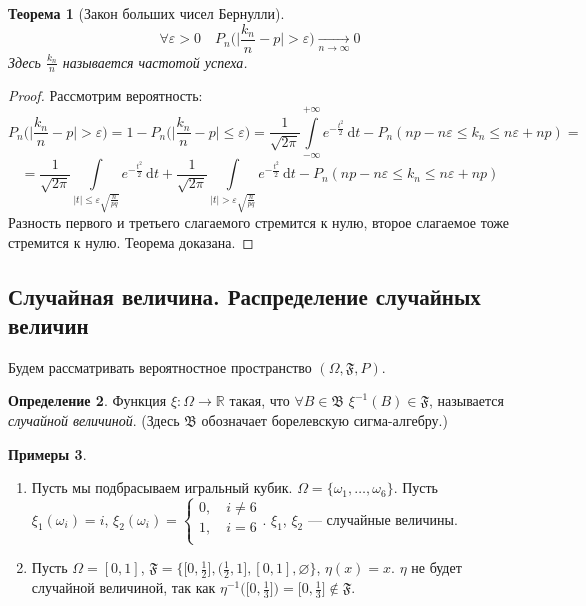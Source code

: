 \documentclass[11pt,openany,a4paper]{scrartcl}
\theoremstyle{plain}
\newtheorem{theorem}{Теорема}[subsection]
\theoremstyle{definition}
\newtheorem{definition}[theorem]{Определение}
\newtheorem{examples}[theorem]{Примеры}
\newcommand\mb{\mathbb}
\newcommand\real{\mb R}
\newcommand{\underto}[1]{\xrightarrow[#1]{}}
\newcommand{\dif}{\, \mathrm d}
\begin{document}
\begin{theorem}[Закон больших чисел Бернулли]\label{large_numbers_bernoulli}
    $$
    \forall \varepsilon > 0\quad P_n\bigg(\bigg|\frac{k_n}{n} -
    p\bigg| > \varepsilon\bigg)
    \underto{n \to \infty} 0
    $$
    Здесь $\frac{k_n}{n}$ называется частотой успеха.
\end{theorem}
\begin{proof}
    Рассмотрим вероятность:
    $$
    P_n\bigg(\bigg|\frac{k_n}{n} -
    p\bigg| > \varepsilon\bigg) = 1 - P_n\bigg(\bigg|\frac{k_n}{n} -
    p\bigg| \leqslant \varepsilon\bigg) =
    \frac{1}{\sqrt{2\pi}}
    \int\limits_{-\infty}^{+\infty}e^{-\frac{t^2}{2}} \dif t -
    P_n(np - n\varepsilon \leqslant k_n \leqslant n\varepsilon + np) =
    $$
    $$
    =\frac{1}{\sqrt{2\pi}}
    \int\limits_{|t|\leqslant \varepsilon \sqrt{\frac{n}{pq}}}
    e^{-\frac{t^2}{2}} \dif t + \frac{1}{\sqrt{2\pi}}
    \int\limits_{|t| > \varepsilon \sqrt{\frac{n}{pq}}}
    e^{-\frac{t^2}{2}} \dif t -
    P_n(np - n\varepsilon \leqslant k_n \leqslant n\varepsilon + np)
    $$
    Разность первого и третьего слагаемого стремится к нулю, второе слагаемое тоже
    стремится к нулю. Теорема доказана.
\end{proof}

\subsection{Случайная величина. Распределение случайных величин}

Будем рассматривать вероятностное пространство $(\Omega, \mathfrak{F}, P)$.

\begin{definition}
    Функция $\xi: \Omega \to \real$ такая, что
    $\forall B \in \mathfrak B$
    $\xi^{-1}(B) \in \mathfrak F$, называется \emph{случайной величиной}.
    (Здесь $\mathfrak B$ обозначает борелевскую сигма-алгебру.)
\end{definition}
\begin{examples}
    \begin{enumerate}
        \item Пусть мы подбрасываем игральный кубик.
        $\Omega = \{\omega_1,\ldots,\omega_6\}$. Пусть $\xi_1(\omega_i) = i$,
        $\xi_2(\omega_i) =
        \begin{cases}
            0,\quad i \neq 6\\
            1,\quad i = 6\\  
        \end{cases}
        $. $\xi_1$, $\xi_2$ — случайные величины.
        \item Пусть $\Omega = [0, 1]$,
        $\mathfrak F = \Big\{\big[0, \frac{1}{2}\big],
        \big(\frac{1}{2}, 1\big], [0, 1], \varnothing\Big\}$,
        $\eta(x) = x$. $\eta$ не будет случайной величиной, так как
        $\eta^{-1}\Big(\big[0, \frac{1}{3}\big]\Big) = \big[0, \frac{1}{3}\big] \notin \mathfrak F$.
    \end{enumerate}
\end{examples}
\end{document}
